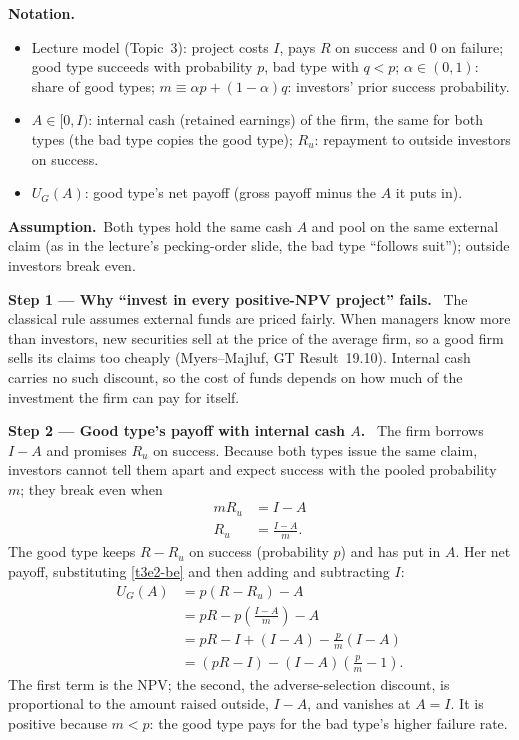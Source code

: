 \documentclass[11pt,a4paper]{article}
\newcommand{\notation}{\par\noindent\textbf{Notation.}}
\newcommand{\step}[2]{\par\medskip\noindent\textbf{Step #1 --- #2.}~}
\newcommand{\assume}{\par\smallskip\noindent\textbf{Assumption.}~}
\begin{document}
\notation
\begin{itemize}
  \item Lecture model (Topic~3): project costs $I$, pays $R$ on success and 0 on failure; good type succeeds with probability $p$, bad type with $q<p$; $\alpha\in(0,1)$: share of good types; $m\equiv\alpha p+(1-\alpha)q$: investors' prior success probability.
  \item $A\in[0,I)$: internal cash (retained earnings) of the firm, the same for both types (the bad type copies the good type); $R_u$: repayment to outside investors on success.
  \item $U_G(A)$: good type's net payoff (gross payoff minus the $A$ it puts in).
\end{itemize}

\assume Both types hold the same cash $A$ and pool on the same external claim (as in the lecture's pecking-order slide, the bad type ``follows suit''); outside investors break even.

\step{1}{Why ``invest in every positive-NPV project'' fails} The classical rule assumes external funds are priced fairly. When managers know more than investors, new securities sell at the price of the average firm, so a good firm sells its claims too cheaply (Myers--Majluf, GT Result~19.10). Internal cash carries no such discount, so the cost of funds depends on how much of the investment the firm can pay for itself.

\step{2}{Good type's payoff with internal cash $A$} The firm borrows $I-A$ and promises $R_u$ on success. Because both types issue the same claim, investors cannot tell them apart and expect success with the pooled probability $m$; they break even when
\begin{align}
  m R_u &= I-A \label{t3e2-be}\\
  R_u &= \frac{I-A}{m}. \nonumber
\end{align}
The good type keeps $R-R_u$ on success (probability $p$) and has put in $A$. Her net payoff, substituting \eqref{t3e2-be} and then adding and subtracting $I$:
\begin{align}
  U_G(A) &= p(R-R_u) - A \nonumber\\
         &= pR - p\left(\frac{I-A}{m}\right) - A \nonumber\\
         &= pR - I + (I-A) - \frac{p}{m}(I-A) \nonumber\\
         &= (pR-I) - (I-A)\left(\frac{p}{m}-1\right). \label{t3e2-UG}
\end{align}
The first term is the NPV; the second, the adverse-selection discount, is proportional to the amount raised outside, $I-A$, and vanishes at $A=I$. It is positive because $m<p$: the good type pays for the bad type's higher failure rate.
\end{document}
